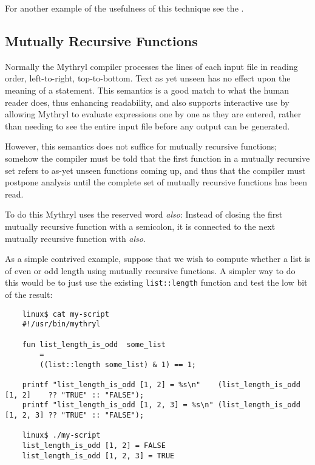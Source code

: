 For another example of the usefulness of this technique see the 
.


\cutend*

\subsection{Mutually Recursive Functions}
\label{section:ref:functions:mutuall-recursive-functions}

Normally the Mythryl compiler processes the lines of each input file 
in reading order, left-to-right, top-to-bottom.  Text as yet unseen 
has no effect upon the meaning of a statement.  This semantics is a 
good match to what the human reader does, thus enhancing readability, 
and  also supports interactive use by allowing Mythryl to evaluate 
expressions one by one as they are entered, rather than needing to 
see the entire input file before any output can be generated.

However, this semantics does not suffice for mutually recursive 
functions;  somehow the compiler must be told that the first 
function in a mutually recursive set refers to as-yet unseen 
functions coming up, and thus that the compiler must postpone 
analysis until the complete set of mutually recursive functions 
has been read.

To do this Mythryl uses the reserved word {\it also}:  Instead 
of closing the first mutually recursive function with a semicolon, 
it is connected to the next mutually recursive function with {\it also}.

As a simple contrived example, suppose that we wish to compute 
whether a list is of even or odd length using mutually recursive 
functions.  A simpler way to do this would be to just use the 
existing {\tt list::length} function and test the low bit of 
the result:

\begin{verbatim}
    linux$ cat my-script
    #!/usr/bin/mythryl

    fun list_length_is_odd  some_list
        =
        ((list::length some_list) & 1) == 1;

    printf "list_length_is_odd [1, 2] = %s\n"    (list_length_is_odd [1, 2]    ?? "TRUE" :: "FALSE");
    printf "list_length_is_odd [1, 2, 3] = %s\n" (list_length_is_odd [1, 2, 3] ?? "TRUE" :: "FALSE");

    linux$ ./my-script
    list_length_is_odd [1, 2] = FALSE
    list_length_is_odd [1, 2, 3] = TRUE
\end{verbatim}

